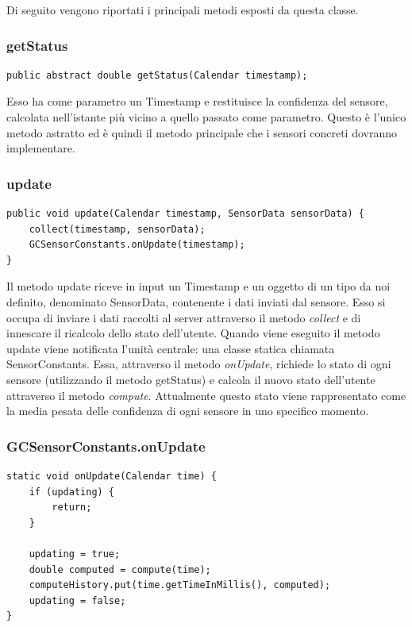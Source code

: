Di seguito vengono riportati i principali metodi esposti da questa classe.
\subsubsection{getStatus}
\begin{verbatim}
public abstract double getStatus(Calendar timestamp);
\end{verbatim}
Esso ha come parametro un Timestamp e restituisce la confidenza del sensore, calcolata nell'istante più vicino a quello passato come parametro. Questo è l'unico metodo astratto ed è quindi il metodo principale che i sensori concreti dovranno implementare.
\subsubsection{update}\label{ref:update-method}

\begin{verbatim}
public void update(Calendar timestamp, SensorData sensorData) {
    collect(timestamp, sensorData);
    GCSensorConstants.onUpdate(timestamp);
}
\end{verbatim}
Il metodo update riceve in input un Timestamp e un oggetto di un tipo da noi definito, denominato SensorData, contenente i dati inviati dal sensore. Esso si occupa di inviare i dati raccolti al server attraverso il metodo \textit{collect} e di innescare il ricalcolo dello stato dell'utente.
Quando viene eseguito il metodo update viene notificata l'unità centrale: una classe statica chiamata SensorConstants. Essa, attraverso il metodo \textit{onUpdate}, richiede lo stato di ogni sensore (utilizzando il metodo getStatus) e calcola il nuovo stato dell'utente attraverso il metodo \textit{compute}. Attualmente questo stato viene rappresentato come la media pesata delle confidenza di ogni sensore in uno specifico momento.

\subsubsection{GCSensorConstants.onUpdate}
\begin{verbatim}
static void onUpdate(Calendar time) {
    if (updating) {
        return;
    }

    updating = true;
    double computed = compute(time);
    computeHistory.put(time.getTimeInMillis(), computed);
    updating = false;
}
\end{verbatim}

